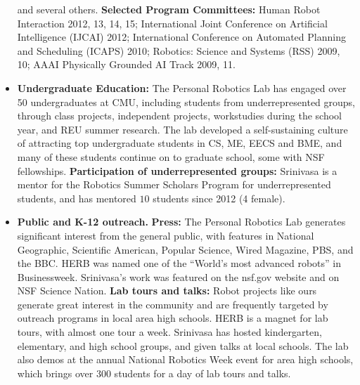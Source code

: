\documentclass[10pt]{article}
\begin{document}
\begin{itemize}
and several others.
\textbf{Selected Program Committees:} 
Human Robot Interaction 2012, 13, 14, 15;
International Joint Conference on Artificial Intelligence (IJCAI) 2012;
International Conference on Automated Planning and Scheduling (ICAPS) 2010;
Robotics: Science and Systems (RSS) 2009, 10; 
AAAI Physically Grounded AI Track 2009, 11.
\item \textbf{Undergraduate Education:}
 The Personal Robotics Lab has engaged over 50 undergraduates at CMU, including students from underrepresented groups, through class projects, independent projects, workstudies during the school year, and REU summer research.  The lab developed a self-sustaining culture of attracting top undergraduate students in CS, ME, EECS and BME, and many of these students continue on to graduate school, some with NSF fellowships. 
 \textbf{Participation of underrepresented groups:}  Srinivasa is a mentor for the Robotics Summer Scholars Program for underrepresented students, and has mentored $10$ students since 2012 (4 female).
\item  \textbf{Public and K-12 outreach.} \textbf{Press:}
The Personal Robotics Lab generates significant interest from the general public, with features in National Geographic, Scientific American, Popular Science, Wired Magazine, PBS, and the BBC. HERB was named one of the ``World's most advanced robots'' in Businessweek. Srinivasa's work was featured on the nsf.gov website and on NSF Science Nation.    
 \textbf{Lab tours and talks:}
Robot projects like ours generate great interest in the community and are frequently targeted by outreach programs in local area high schools.  HERB is a magnet for lab tours, with almost one tour a week. Srinivasa has hosted kindergarten, elementary, and high school groups, and given talks at local schools. The lab also demos at the annual National Robotics Week event for area high schools, which brings over 300 students for a day of lab tours and talks.
\end{itemize}

 
% 
\end{document}
